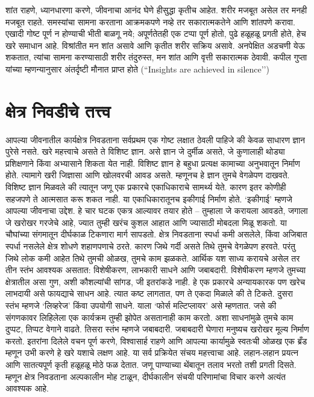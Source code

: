 शांत राहणे, ध्यानधारणा करणे, जीवनाचा आनंद घेणे हीसुद्धा कृतीच आहेत. शरीर मजबूत असेल तर मनही मजबूत राहते. समस्यांचा सामना करताना आक्रमकपणे नव्हे तर सकारात्मकतेने आणि शांतपणे करावा. एखादी गोष्ट पूर्ण न होण्याची भीती बाळगू नये; अपूर्णतेतही एक टप्पा पूर्ण होतो, पुढे हळूहळू प्रगती होते, हेच खरे समाधान आहे. विश्रांतीत मन शांत असावे आणि कृतीत शरीर सक्रिय असावे. अनपेक्षित अडचणी येऊ शकतात, त्यांचा सामना करण्यासाठी शरीर तंदुरुस्त, मन शांत आणि वृत्ती सकारात्मक ठेवावी. कपील गुप्ता यांच्या म्हणन्यानुसार अंतर्दृष्टी मौनात प्राप्त होते (``Insights are achieved in silence’’)

\section*{क्षेत्र निवडीचे तत्त्व}
आपल्या जीवनातील कार्यक्षेत्र निवडताना सर्वप्रथम एक गोष्ट लक्षात ठेवली पाहिजे की केवळ साधारण ज्ञान पुरेसे नसते. खरे महत्त्वाचे असते ते विशिष्ट ज्ञान. असे ज्ञान जे दुर्मीळ असते, जे कुणालाही थोड्या प्रशिक्षणाने किंवा अभ्यासाने शिकता येत नाही. विशिष्ट ज्ञान हे बहुधा प्रत्यक्ष कामाच्या अनुभवातून निर्माण होते. त्यामागे खरी जिज्ञासा आणि खोलवरची आवड असते. म्हणूनच हे ज्ञान तुमचे वेगळेपण दाखवते.
विशिष्ट ज्ञान मिळवले की त्यातून जणू एक प्रकारचे एकाधिकाराचे सामर्थ्य येते. कारण इतर कोणीही सहजपणे ते आत्मसात करू शकत नाही. या एकाधिकारातूनच इकीगाई निर्माण होते. ‘इकीगाई’ म्हणजे आपल्या जीवनाचा उद्देश. हे चार घटक एकत्र आल्यावर तयार होते – तुम्हाला जे करायला आवडते, जगाला जे खरोखर गरजेचे आहे, ज्यात तुम्ही खरंच कुशल आहात आणि ज्यासाठी मोबदला मिळू शकतो. या चौघांच्या संगमातून दीर्घकाळ टिकणारा मार्ग सापडतो.
क्षेत्र निवडताना स्पर्धा कमी असलेले, किंवा अजिबात स्पर्धा नसलेले क्षेत्र शोधणे शहाणपणाचे ठरते. कारण जिथे गर्दी असते तिथे तुमचे वेगळेपण हरवते. परंतु जिथे लोक कमी आहेत तिथे तुमची ओळख, तुमचे काम झळकते.
आर्थिक यश साध्य करायचे असेल तर तीन स्तंभ आवश्यक असतात: विशेषीकरण, लाभकारी साधने आणि जबाबदारी. विशेषीकरण म्हणजे तुमच्या क्षेत्रातील असा गुण, अशी कौशल्यांची सांगड, जी इतरांकडे नाही. हे एक प्रकारचे अन्यायकारक पण खरेच लाभदायी असे फायद्याचे साधन आहे. त्यात कष्ट लागतात, पण ते एकदा मिळाले की ते टिकते.
दुसरा स्तंभ म्हणजे ‘लिव्हरेज’ किंवा उपयोगी साधने. याला ‘फोर्स मल्टिप्लायर’ असे म्हणतात. जसे की संगणकावर लिहिलेला एक कार्यक्रम तुम्ही झोपेत असतानाही काम करतो. अशा साधनांमुळे तुमचे काम दुप्पट, तिप्पट वेगाने वाढते.
तिसरा स्तंभ म्हणजे जबाबदारी. जबाबदारी घेणारा मनुष्यच खरोखर मूल्य निर्माण करतो. इतरांना दिलेले वचन पूर्ण करणे, विश्वासार्ह राहणे आणि आपल्या कार्यामुळे स्वतःची ओळख एक ब्रँड म्हणून उभी करणे हे खरे यशाचे लक्षण आहे.
या सर्व प्रक्रियेत संचय महत्त्वाचा आहे. लहान-लहान प्रयत्न आणि सातत्यपूर्ण कृती हळूहळू मोठे फळ देतात. जणू पाण्याच्या थेंबातून तलाव भरतो तशी प्रगती दिसते. म्हणून क्षेत्र निवडताना अल्पकालीन मोह टाळून, दीर्घकालीन संचयी परिणामांचा विचार करणे अत्यंत आवश्यक आहे.

